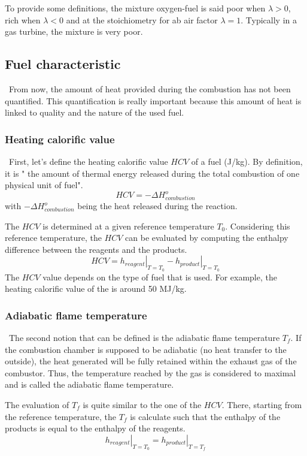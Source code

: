 To provide some definitions, the mixture oxygen-fuel is said poor when $\lambda>0$, rich when $\lambda<0$ and at the stoichiometry for ab air factor $\lambda=1$. Typically in a gas turbine, the mixture is very poor.
\newpage
\subsection{Fuel characteristic}
\quad\, From now, the amount of heat provided during the combustion has not been quantified. This quantification is really important because this amount of heat is linked to quality and the nature of the used fuel.

\subsubsection{Heating calorific value}
\quad\, First, let's define the heating calorific value $HCV$ of a fuel (J/kg). By definition, it is " the amount of thermal energy released during the total combustion of one physical unit of fuel"\citep{Leonard2018}. 
\begin{equation}
HCV = -\Delta H^o_{combustion} \label{eq:C3_HCV1}
\end{equation}
with $-\Delta H^o_{combustion}$ being the heat released during the reaction.

The $HCV$ is determined at a given reference temperature $T_0$. Considering this reference temperature, the $HCV$ can be evaluated by computing the enthalpy difference between the reagents and the products. 
\begin{equation}
HCV = \left.h_{reagent}\right|_{T=T_0} - \left.h_{product}\right|_{T=T_0}\label{eq:C3_HCV2}
\end{equation}
The $HCV$ value depends on the type of fuel that is used. For example, the heating calorific value of the  is around 50 MJ/kg.

\subsubsection{Adiabatic flame temperature}
\quad\, The second notion that can be defined is the adiabatic flame temperature $T_f$. If the combustion chamber is supposed to be adiabatic (no heat transfer to the outside), the heat generated will be fully retained within the exhaust gas of the combustor. Thus, the temperature reached by the gas is considered to maximal and is called the adiabatic flame temperature.

The evaluation of $T_f$ is quite similar to the one of the $HCV$. There, starting from the reference temperature, the $T_f$ is calculate such that the enthalpy of the products is equal to the enthalpy of the reagents.
\begin{equation}
\left.h_{reagent}\right|_{T=T_0} = \left.h_{product}\right|_{T=T_f}\label{eq:C3_T_f}
\end{equation}
\newpage
